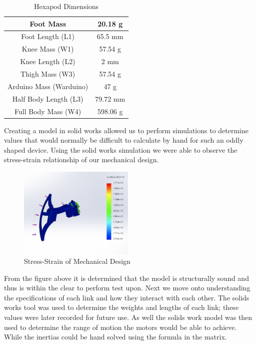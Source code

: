 \begin{table}[htbp]
	\caption{Hexapod Dimensions}
	\begin{center}
		\begin{tabular}{|c|c|}
			\hline  
			Foot Mass & 20.18 g \\
			\hline
			Foot Length (L1) & 65.5 mm\\
			\hline
			Knee Mass (W1) & 57.54 g\\
			\hline
			Knee Length (L2) & 2 mm\\
			\hline
			Thigh Mass (W3) & 57.54 g\\
			\hline
			Arduino Mass (Warduino) & 47 g\\
			\hline
			Half Body Length (L3) & 79.72 mm\\
			\hline
			Full Body Mass (W4) & 598.06 g \\
		 	\hline
			
			
		\end{tabular}
		\end{center}
	\label{tab1}
	
\end{table}


Creating a model in solid works allowed us to perform simulations to determine values that would normally be difficult to calculate by hand for such an oddly shaped device. Using the solid works simulation we were able to observe the stress-strain relationship of our mechanical design.

\begin{figure}[h]
 \centering
   \includegraphics[width = 0.49\textwidth]{figures/4.png}                \caption{Stress-Strain of Mechanical Design}
   \label{fig:Stress-Strain of Mechanical Design}
\end{figure}



From the figure above it is determined that the model is structurally sound and thus is within the clear to perform test upon. Next we move onto understanding the specifications of each link and how they interact with each other. The solids works tool was used to determine the weights and lengths of each link; these values were later recorded for future use. As well the solids work model was then used to determine the range of motion the motors would be able to achieve. While the inertias could be hand solved using the formula in the matrix.\\

